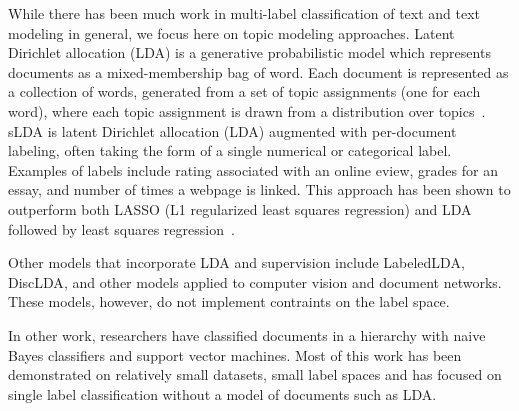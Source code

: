 While there has been much work in multi-label classification of text and
text modeling in general, we focus here on topic modeling approaches.
Latent Dirichlet allocation (LDA) is a generative probabilistic model which
represents documents as a mixed-membership bag of word. Each document is
represented as a collection of words, generated from a set of topic assignments
(one for each word), where each topic assignment is drawn from a distribution
over topics~\citep{Blei2003}. sLDA is latent Dirichlet allocation (LDA)
\cite{Blei2003} augmented with per-document labeling, often taking the form of
a single numerical or categorical label. Examples of labels include rating
associated with an online  eview, grades for an essay, and number of times a
webpage is linked. This approach has been shown to outperform both LASSO
(L1 regularized least squares regression) and LDA followed by least
squares regression~\cite{BleiMcAuliffe2008}.



Other models that incorporate LDA and supervision include
LabeledLDA\citep{Ramage2009}, DiscLDA\citep{DiscLDA}, and other models applied to 
computer vision and document networks\citep{wangbleifeifei08,RelationalLDA}. 
These models, however, do not implement contraints on the label space.

In other work, researchers have classified documents in a hierarchy with naive Bayes classifiers
and support vector machines. Most of this work has been demonstrated on relatively
small datasets, small label spaces and has focused on single label classification without
a model of documents such as LDA\citep{mccallum99building,Dumais2000HCW,Kollerilprints291,Chakrabarti1998SFS}.

